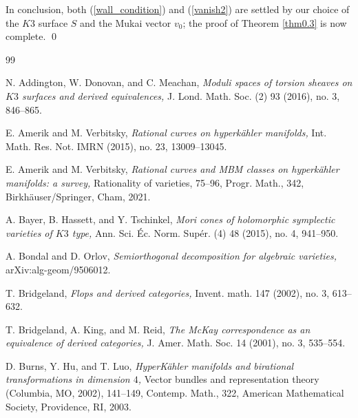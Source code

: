 \documentclass[11pt]{amsart}
\theoremstyle{plain}
\theoremstyle{definition}
\theoremstyle{remark}
\newcommand{\BP}{{\mathbb{P}}}
\begin{document}
In conclusion, both (\ref{wall_condition}) and (\ref{vanish2}) are settled by our choice of the $K3$ surface $S$ and the Mukai vector $v_0$; the proof of Theorem \ref{thm0.3} is now complete. \qed



\begin{thebibliography}{99}

 N. Addington, W. Donovan, and C. Meachan, {\em Moduli spaces of torsion sheaves on $K3$ surfaces and derived equivalences,} J. Lond. Math. Soc. (2) 93 (2016), no. 3, 846--865.


 E. Amerik and M. Verbitsky, {\em Rational curves on hyperk\"ahler manifolds,} Int. Math. Res. Not. IMRN (2015), no. 23, 13009--13045.

 E. Amerik and M. Verbitsky, {\em Rational curves and MBM classes on hyperk\"ahler manifolds: a survey,} Rationality of varieties, 75--96, Progr. Math., 342, Birkh\"auser/Springer, Cham, 2021.



 A. Bayer, B. Hassett, and Y. Tschinkel, {\em Mori cones of holomorphic symplectic varieties of $K3$ type,} Ann. Sci. \'Ec. Norm. Sup\'er. (4) 48 (2015), no. 4, 941--950.

 A. Bondal and D. Orlov, {\em Semiorthogonal decomposition for algebraic varieties,} arXiv:alg-geom/9506012.

 T. Bridgeland, {\em Flops and derived categories,} Invent. math. 147 (2002), no. 3, 613--632.

 T. Bridgeland, A. King, and M. Reid, {\em The McKay correspondence as an equivalence of derived categories,} J. Amer. Math. Soc. 14 (2001), no. 3, 535--554.

 D. Burns, Y. Hu, and T. Luo, {\em HyperK\"ahler manifolds and birational transformations in dimension $4$,} Vector bundles and representation theory (Columbia, MO, 2002), 141--149, Contemp. Math., 322, American Mathematical Society, Providence, RI, 2003.


\end{thebibliography}
\end{document}
